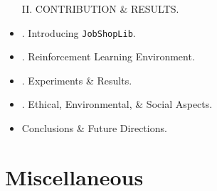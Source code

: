 \documentclass{article}
\begin{document}
\begin{itemize}
    II. CONTRIBUTION \& RESULTS.
    \item {. Introducing {\tt JobShopLib}.}
    \item {. Reinforcement Learning Environment.}
    \item {. Experiments \& Results.}
    \item {. Ethical, Environmental, \& Social Aspects.}
    \item {\sf Conclusions \& Future Directions.}

\end{itemize}



\section{Miscellaneous}


\printbibliography[heading=bibintoc]
\end{document}
